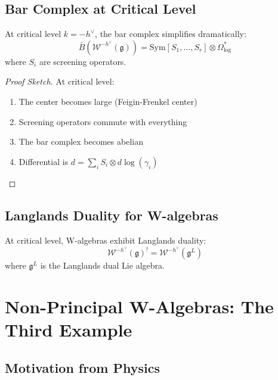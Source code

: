 \subsection{Bar Complex at Critical Level}

\begin{theorem}
At critical level $k = -h^{\vee}$, the bar complex simplifies dramatically:
\[
\bar{B}(\mathcal{W}^{-h^{\vee}}(\mathfrak{g})) = \text{Sym}[S_1, \ldots, S_r] \otimes \Omega^*_{\log}
\]
where $S_i$ are screening operators.
\end{theorem}

\begin{proof}[Proof Sketch]
At critical level:
\begin{enumerate}
\item The center becomes large (Feigin-Frenkel center)
\item Screening operators commute with everything
\item The bar complex becomes abelian
\item Differential is $d = \sum_i S_i \otimes d\log(\gamma_i)$
\end{enumerate}
\end{proof}

\subsection{Langlands Duality for W-algebras}

\begin{theorem}
At critical level, W-algebras exhibit Langlands duality:
\[
\mathcal{W}^{-h^{\vee}}(\mathfrak{g})^! = \mathcal{W}^{-h^{\vee}}(\mathfrak{g}^L)
\]
where $\mathfrak{g}^L$ is the Langlands dual Lie algebra.
\end{theorem}


\section{Non-Principal W-Algebras: The Third Example}

\subsection{Motivation from Physics}

